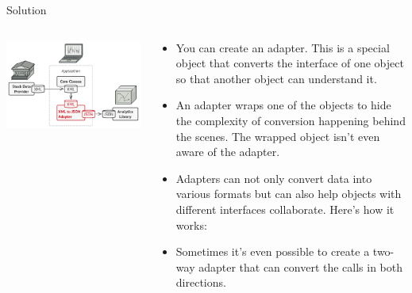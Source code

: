 \documentclass[13pt]{beamer}
\begin{document}
\begin{frame}{Solution}
	\begin{columns}[T]
		\begin{column}{.5\textwidth}
			\includegraphics[scale=0.3]{./images/solution.png}
		\end{column}
	
		\begin{column}{.5\textwidth}
			\begin{itemize}
				\item You can create an adapter. This is a special object that converts the interface of one object so that another object can understand it.
				\item An adapter wraps one of the objects to hide the complexity of conversion happening behind the scenes. The wrapped object isn’t even aware of the adapter.
				\item Adapters can not only convert data into various formats but can also help objects with different interfaces collaborate. Here’s how it works:
				\item Sometimes it’s even possible to create a two-way adapter that can convert the calls in both directions.
			\end{itemize}
		\end{column}
	\end{columns}
\end{frame}
\end{document}
